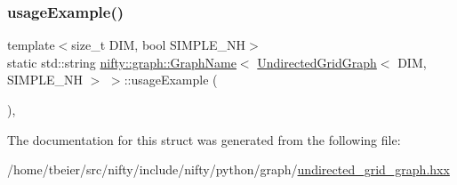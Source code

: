 \subsubsection{\texorpdfstring{usage\+Example()}{usageExample()}}
{\footnotesize\ttfamily template$<$size\+\_\+t D\+IM, bool S\+I\+M\+P\+L\+E\+\_\+\+NH$>$ \\
static std\+::string \hyperlink{structnifty_1_1graph_1_1GraphName}{nifty\+::graph\+::\+Graph\+Name}$<$ \hyperlink{classnifty_1_1graph_1_1UndirectedGridGraph}{Undirected\+Grid\+Graph}$<$ D\+IM, S\+I\+M\+P\+L\+E\+\_\+\+NH $>$ $>$\+::usage\+Example (\begin{DoxyParamCaption}{ }\end{DoxyParamCaption})\hspace{0.3cm}{\ttfamily [inline]}, {\ttfamily [static]}}



The documentation for this struct was generated from the following file\+:\begin{DoxyCompactItemize}
\item 
/home/tbeier/src/nifty/include/nifty/python/graph/\hyperlink{python_2graph_2undirected__grid__graph_8hxx}{undirected\+\_\+grid\+\_\+graph.\+hxx}\end{DoxyCompactItemize}
